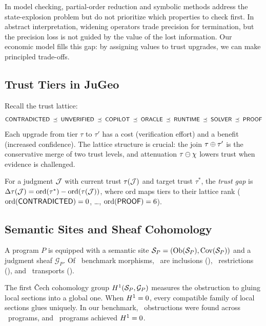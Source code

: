 \documentclass[11pt]{article}
\begin{document}
In model checking, partial-order reduction and symbolic methods
address the state-explosion problem but do not prioritize which
properties to check first.  In abstract interpretation, widening
operators trade precision for termination, but the precision loss
is not guided by the value of the lost information.  Our economic
model fills this gap: by assigning values to trust upgrades, we
can make principled trade-offs.

\subsection{Trust Tiers in JuGeo}
Recall the trust lattice:
\[
  \mathsf{CONTRADICTED} \;\preceq\; \mathsf{UNVERIFIED} \;\preceq\; \mathsf{COPILOT} \;\preceq\;
  \mathsf{ORACLE} \;\preceq\; \mathsf{RUNTIME} \;\preceq\; \mathsf{SOLVER} \;\preceq\; \mathsf{PROOF}
\]
Each upgrade from tier $\tau$ to $\tau'$ has a cost (verification
effort) and a benefit (increased confidence).  The lattice structure
is crucial: the join $\tau \oplus \tau'$ is the conservative merge of
two trust levels, and attenuation $\tau \ominus \chi$ lowers trust
when evidence is challenged.

\begin{definition}\label{def:trust-gap}
For a judgment $\mathcal{J}$ with current trust $\tau(\mathcal{J})$ and target trust
$\tau^*$, the \emph{trust gap} is $\Delta\tau(\mathcal{J}) =
\mathrm{ord}(\tau^*) - \mathrm{ord}(\tau(\mathcal{J}))$, where
$\mathrm{ord}$ maps tiers to their lattice rank
($\mathrm{ord}(\mathsf{CONTRADICTED}) = 0$, \ldots, $\mathrm{ord}(\mathsf{PROOF}) = 6$).
\end{definition}

\subsection{Semantic Sites and Sheaf Cohomology}
A program $P$ is equipped with a semantic site
$\mathcal{S}_P = (\mathrm{Ob}(\mathcal{S}_P), \mathrm{Cov}(\mathcal{S}_P))$ and a judgment sheaf
$\mathcal{G}_P$.  Of \compMorphTotal\ benchmark morphisms,
\compMorphInclusion\ are inclusions (\compMorphInclusionPct),
\compMorphRestriction\ restrictions (\compMorphRestrictionPct), and
\compMorphTransport\ transports (\compMorphTransportPct).

The first \v{C}ech cohomology group $H^{1}(\mathcal{S}_P, \mathcal{G}_P)$
measures the obstruction to gluing local sections into a global one.
When $H^{1} = 0$, every compatible family of local sections glues
uniquely.  In our benchmark, \compObstructionTotal\ obstructions were
found across \compTotalPrograms\ programs, and \expHOneZero\ programs
achieved $H^{1} = 0$.
\end{document}
